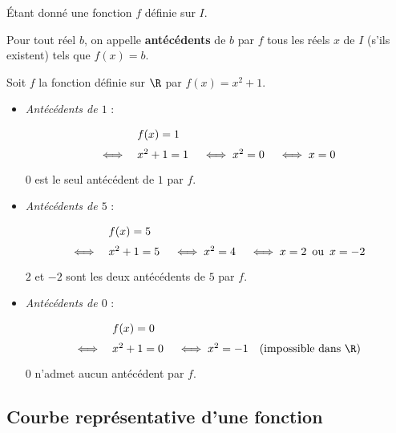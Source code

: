 
Étant donné une fonction $f$ définie sur $I$.

Pour tout réel $b$, on appelle \textbf{antécédents} de $b$ par $f$ tous les réels $x$ de $I$ (s'ils existent) tels que $f(x)=b$.

\ex

Soit $f$ la fonction définie sur $\R$ par $f(x)=x^2+1$.
\begin{itemize}
	\item \textit{Antécédents de $1$} :\\ \ms
	      $$\def\arraystretch{1.5}
		      \begin{array}{rl}
			      ~    & f(x)=1                                    \\
			      \iff & x^{2}+1=1 \quad \iff x^2=0 \quad \iff x=0
		      \end{array}
	      $$
	      $0$ est le seul antécédent de $1$ par $f$.
	      \newpage
	\item \textit{Antécédents de $5$} :\\ \ms
	      $$\def\arraystretch{1.5}
		      \begin{array}{rl}
			      ~    & f(x)=5                                                     \\
			      \iff & x^{2}+1=5\quad \iff x^2=4\quad \iff x=2\,\text{ ou }\,x=-2
		      \end{array}
	      $$
	      $2$ et $-2$ sont les deux antécédents de $5$ par $f$.

	\item \textit{Antécédents de $0$} :\\ \ms
	      $$\def\arraystretch{1.5}
		      \begin{array}{rl}
			      ~    & f(x)=0                                                         \\
			      \iff & x^{2}+1=0 \quad \iff x^2=-1\quad \text{(impossible dans $\R$)}
		      \end{array}
	      $$
	      $0$ n'admet aucun antécédent par $f$.
\end{itemize}

\subsection{Courbe représentative d'une fonction}


\def\manote{~\\ \begin{tikzpicture}
		\draw[->, >=Triangle, line width=1pt] (-0.5,0) -- (3.5,0) node[right] {$x$};
		\draw[->, >=Triangle, line width=1pt] (0,-0.5) -- (0,3.5) node[above] {$y$};
		\draw[domain=0:3, smooth, variable=\x, blue, line width=1.5pt] plot ({\x}, {0.5*\x*\x/2 + 0.5});
		\draw[dashed] (2,0) -- (2,1.5);
		\draw[dashed] (0,1.5) -- (2,1.5);
		\node[below, font=\large] at (2,-0.1) {$x$};
		\node[left, font=\large] at (0,1.5) {$f(x)$};
		\node[above right,font=\large] at (2.3,2.5) {$\Cf$};
		\fill[red] (2,1.5) circle (2pt);
	\end{tikzpicture}}

